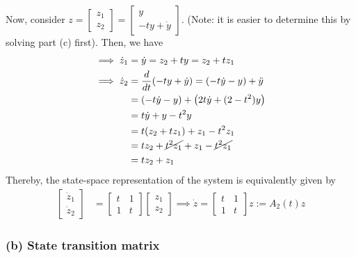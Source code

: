 Now, consider \( z = \begin{bmatrix} z_1 \\ z_2 \end{bmatrix} = \begin{bmatrix} y \\ -t y + \dot y \end{bmatrix} \).
(Note: it is easier to determine this by solving part (c) first).
Then, we have
\begin{align*}
    \implies
    \dot z_1
     & =
    \dot y = z_2 + t y
    =
    z_2 + t z_1
    \\
    \implies
    \dot z_2
     & =
    \frac{d}{dt} (-t y + \dot y)
    =
    (-t \dot y - y) + \ddot y
    \\ & =
    (-t \dot y - y) + \left( 2t \dot y + (2 - t^2)y \right)
    \\ & =
    t \dot y + y - t^2 y
    \\ & =
    t (z_2 + t z_1) + z_1 - t^2 z_1
    \\ & =
    t z_2 + \cancel{t^2 z_1} + z_1 - \cancel{t^2 z_1}
    \\ & =
    t z_2 + z_1
\end{align*}
Thereby, the state-space representation of the system is equivalently given by
\begin{align*}
    \begin{bmatrix}
        \dot z_1 \\
        \dot z_2
    \end{bmatrix}
     & =
    \begin{bmatrix}
        t & 1 \\
        1 & t
    \end{bmatrix}
    \begin{bmatrix}
        z_1 \\
        z_2
    \end{bmatrix}
    \implies
    \dot z
    =
    \begin{bmatrix}
        t & 1 \\
        1 & t
    \end{bmatrix}
    z
    :=
    A_2(t) z
\end{align*}

\subsubsection*{(b) State transition matrix}

